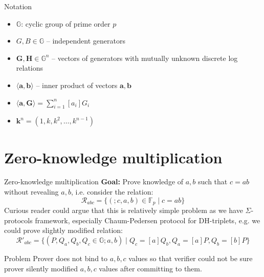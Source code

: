 \documentclass{zkdl-presentation-template}
\begin{document}
\begin{frame}{Notation}
    \begin{itemize}
        \item $\mathbb{G}$: cyclic group of prime order $p$
        \item $G, B \in \mathbb{G}$ -- independent generators
        \item $\mathbf{G}, \mathbf{H} \in \mathbb{G}^n$ -- vectors of generators with mutually unknown discrete log relations
        \item $\langle \mathbf{a}, \mathbf{b} \rangle$ -- inner product of vectors $\mathbf{a}, \mathbf{b}$
        \item $\langle \mathbf{a}, \mathbf{G} \rangle = \sum_{i=1}^n [a_i] G_i$
        \item $\mathbf{k}^n = (1, k, k^2, \dots, k^{n-1})$
    \end{itemize}
\end{frame}


\section{Zero-knowledge multiplication}

\begin{frame}{Zero-knowledge multiplication}
    \textbf{Goal:} Prove knowledge of $a, b$ such that $c = ab$ without revealing $a, b$, i.e. consider the relation:
    $$\mathcal{R}_{abc} = \{ (;c,a,b) \in \mathbb{F}_p \mid c=ab \}$$
    Curious reader could argue that this is relatively simple problem as we have $\Sigma$-protocols framework, especially Chaum-Pedersen protocol for DH-triplets, e.g. we could prove slightly modified relation:
    $$\mathcal{R}'_{abc} = \{ (P, Q_a, Q_b, Q_c \in \mathbb{G};a,b) \mid Q_c = [a]Q_b, Q_a = [a]P, Q_b = [b]P \}$$
    
    \begin{alertblock}{Problem}
        Prover does not bind to $a,b,c$ values so that verifier could not be sure prover silently modified $a,b,c$ values after committing to them.
    \end{alertblock}
\end{frame}
\end{document}
